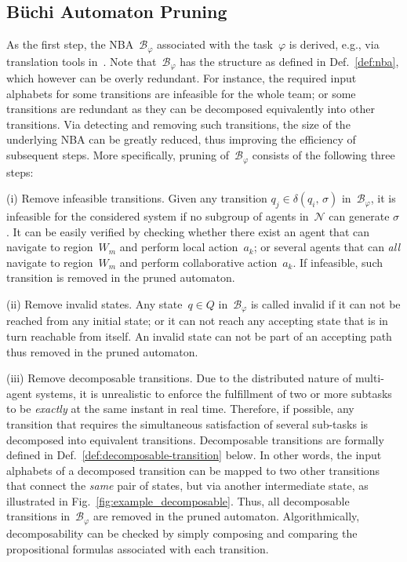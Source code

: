 \subsection{B\"{u}chi Automaton Pruning}
\label{subsubsec:NBA-pruning}
As the first step, the NBA~$\mathcal{B}_{\varphi}$ associated with the task~$\varphi$
is derived, e.g., via translation tools in~\cite{gastin2001fast}.
Note that~$\mathcal{B}_{\varphi}$ has the structure as defined in Def.~\ref{def:nba},
which however can be overly redundant.
For instance, the required input alphabets for some transitions are infeasible for the whole team;
or some transitions are redundant as they can be decomposed equivalently
into other transitions.
Via detecting and removing such transitions, the size of the underlying NBA
can be greatly reduced, thus improving the efficiency of subsequent steps.
More specifically, pruning of~$\mathcal{B}_{\varphi}$ consists of the following three steps:

(i) Remove infeasible transitions.
Given any transition $q_j \in \delta(q_i,\, \sigma)$ in~$\mathcal{B}_{\varphi}$,
it is infeasible for the considered system if
no subgroup of agents in~$\mathcal{N}$ can generate $\sigma$.
It can be easily verified by checking whether there exist an agent that can navigate to region~$W_m$ and perform local action~$a_k$;
or several agents that can \emph{all} navigate to region~$W_m$ and perform collaborative action~$a_k$.
If infeasible, such transition is removed in the pruned automaton.

(ii) Remove invalid states.
Any state~$q\in Q$ in~$\mathcal{B}_{\varphi}$ is called invalid
if it can not be reached from any initial state;
or it can not reach any accepting state that is in turn reachable from itself.
An invalid state can not be part of an accepting path thus removed in the pruned automaton.

(iii) Remove decomposable transitions.
Due to the distributed nature of multi-agent systems,
it is unrealistic to enforce the fulfillment of two or more subtasks
to be \emph{exactly} at the same instant in real time.
Therefore, if possible,
any transition that requires the simultaneous satisfaction of several sub-tasks is decomposed into equivalent transitions.
Decomposable transitions are formally defined in
Def.~\ref{def:decomposable-transition} below.
In other words, the input alphabets of a decomposed transition can be mapped to
two other transitions that connect the \emph{same} pair of states,
but via another intermediate state, as illustrated in Fig.~\ref{fig:example_decomposable}.
Thus, all decomposable transitions in~$\mathcal{B}_{\varphi}$ are removed in the pruned automaton.
Algorithmically, decomposability can be checked by simply composing and comparing the
propositional formulas associated with each transition.

